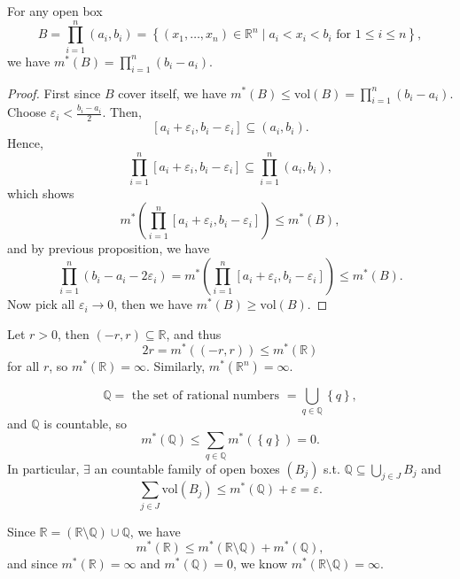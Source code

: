\begin{corollary}
    For any open box 
    \[
        B = \prod _{i=1}^n (a_i, b_i) = \left\{ (x_1, \dots , x_n) \in \mathbb{R} ^n \mid a_i < x_i < b_i \text{ for } 1 \le i \le n  \right\},
    \]
    we have \(m^*(B) = \prod _{i=1}^n (b_i - a_i)\). 
\end{corollary}

\begin{proof}
    First since \(B\) cover itself, we have \(m^*(B) \le \mathrm{vol}(B) = \prod _{i=1}^n (b_i - a_i) \). Choose \(\varepsilon_i < \frac{b_i - a_i}{2}\). Then, 
    \[
        [a_i + \varepsilon_i, b_i - \varepsilon_i] \subseteq (a_i, b_i).
    \]   
    Hence,
    \[
        \prod _{i=1}^n [a_i + \varepsilon_i, b_i - \varepsilon_i] \subseteq \prod _{i=1}^n (a_i, b_i),
    \]
    which shows 
    \[
        m^* \left( \prod _{i=1}^n [a_i + \varepsilon_i, b_i - \varepsilon_i] \right) \le m^* (B), 
    \]
    and by previous proposition, we have 
    \[
        \prod _{i=1}^n (b_i - a_i - 2 \varepsilon_i) = m^* \left( \prod _{i=1}^n [a_i + \varepsilon_i, b_i - \varepsilon_i] \right) \le m^* (B).
    \]
    Now pick all \(\varepsilon _i \to 0\), then we have \(m^*(B) \ge \mathrm{vol} (B) \).  
\end{proof}

\begin{eg}
    Let \(r > 0\), then \((-r, r) \subseteq \mathbb{R} \), and thus 
    \[
        2r = m^* ((-r, r)) \le m^* (\mathbb{R} ) 
    \]  
    for all \(r\), so \(m^*(\mathbb{R} ) = \infty \). Similarly, \(m^*(\mathbb{R} ^n) = \infty \).   
\end{eg}

\begin{eg}
    \[
        \mathbb{Q} = \text{ the set of rational numbers } = \bigcup_{q \in \mathbb{Q} } \left\{ q \right\},   
    \]
    and \(\mathbb{Q} \) is countable, so 
    \[
        m^*(\mathbb{Q} ) \le \sum_{q \in \mathbb{Q} } m^*(\left\{ q \right\} ) = 0. 
    \]
    In particular, \(\exists \) an countable family of open boxes \((B_j)\) s.t. \(\mathbb{Q} \subseteq \bigcup_{j \in J} B_j \) and 
    \[
        \sum_{j \in J} \mathrm{vol}(B_j) \le m^*(\mathbb{Q} ) + \varepsilon = \varepsilon.  
    \]   
\end{eg}

\begin{eg}
    Since \(\mathbb{R} = (\mathbb{R} \setminus \mathbb{Q} ) \cup \mathbb{Q} \), we have 
    \[
        m^*(\mathbb{R} ) \le m^*(\mathbb{R} \setminus \mathbb{Q} ) + m^*(\mathbb{Q} ),
    \] 
    and since \(m^*(\mathbb{R} ) = \infty\) and \(m^*(\mathbb{Q} ) = 0\), we know \(m^*(\mathbb{R} \setminus \mathbb{Q} ) = \infty \).   
\end{eg}

